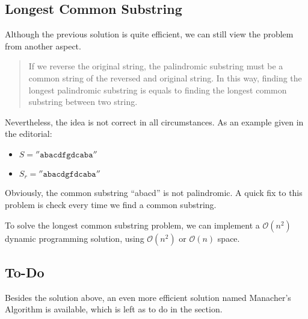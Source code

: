 \documentclass[varwidth]{standalone}
\begin{document}
\subsection{Longest Common Substring}
Although the previous solution is quite efficient, we can still view the
problem from another aspect.
\begin{quote}
    If we reverse the original string, the palindromic substring must be
    a common string of the reversed and original string.
    In this way, finding the longest palindromic substring is equals to
    finding the longest common substring between two string.
\end{quote}
Nevertheless, the idea is not correct in all circumstances. As an example given
in the editorial:
\begin{itemize}
    \item $S = \mathtt{''abacdfgdcaba''}$
    \item $S_r = \mathtt{''abacdgfdcaba''}$
\end{itemize}
Obviously, the common substring ``abacd'' is not palindromic.
A quick fix to this problem is check every time we find a common substring.

To solve the longest common substring problem, we can implement a
$\mathcal{O}(n^2)$ dynamic programming solution, using $\mathcal{O}(n^2)$ or
$\mathcal{O}(n)$ space.

\subsection{To-Do}
Besides the solution above, an even more efficient solution named 
Manacher's Algorithm is available, which is left as to do in the section.
\end{document}
